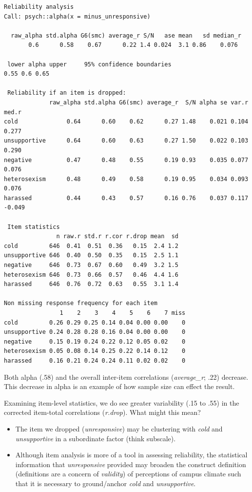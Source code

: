\documentclass[
  english,
]{book}
\providecommand{\tightlist}{%
  \setlength{\itemsep}{0pt}\setlength{\parskip}{0pt}}
\begin{document}
\begin{verbatim}
Reliability analysis   
Call: psych::alpha(x = minus_unresponsive)

  raw_alpha std.alpha G6(smc) average_r S/N   ase mean   sd median_r
       0.6      0.58    0.67      0.22 1.4 0.024  3.1 0.86    0.076

 lower alpha upper     95% confidence boundaries
0.55 0.6 0.65 

 Reliability if an item is dropped:
             raw_alpha std.alpha G6(smc) average_r  S/N alpha se var.r  med.r
cold              0.64      0.60    0.62      0.27 1.48    0.021 0.104  0.277
unsupportive      0.64      0.60    0.63      0.27 1.50    0.022 0.103  0.290
negative          0.47      0.48    0.55      0.19 0.93    0.035 0.077  0.076
heterosexism      0.48      0.49    0.58      0.19 0.95    0.034 0.093  0.076
harassed          0.44      0.43    0.57      0.16 0.76    0.037 0.117 -0.049

 Item statistics 
               n raw.r std.r r.cor r.drop mean  sd
cold         646  0.41  0.51  0.36   0.15  2.4 1.2
unsupportive 646  0.40  0.50  0.35   0.15  2.5 1.1
negative     646  0.73  0.67  0.60   0.49  3.2 1.5
heterosexism 646  0.73  0.66  0.57   0.46  4.4 1.6
harassed     646  0.76  0.72  0.63   0.55  3.1 1.4

Non missing response frequency for each item
                1    2    3    4    5    6    7 miss
cold         0.26 0.29 0.25 0.14 0.04 0.00 0.00    0
unsupportive 0.24 0.28 0.28 0.16 0.04 0.00 0.00    0
negative     0.15 0.19 0.24 0.22 0.12 0.05 0.02    0
heterosexism 0.05 0.08 0.14 0.25 0.22 0.14 0.12    0
harassed     0.16 0.21 0.24 0.24 0.11 0.02 0.02    0
\end{verbatim}

Both alpha (.58) and the overall inter-item correlations (\emph{average\_r}; .22) decrease. This decrease in alpha is an example of how sample size can effect the result.

Examining item-level statistics, we do see greater variability (.15 to .55) in the corrected item-total correlations (\emph{r.drop}). What might this mean?

\begin{itemize}
\tightlist
\item
  The item we dropped (\emph{unresponsive}) may be clustering with \emph{cold} and \emph{unsupportive} in a subordinate factor (think subscale).
\item
  Although item analysis is more of a tool in assessing reliability, the statistical information that \emph{unresponsive} provided may broaden the construct definition (definitions are a concern of \emph{validity}) of perceptions of campus climate such that it is necessary to ground/anchor \emph{cold} and \emph{unsupportive}.
\end{itemize}
\end{document}
